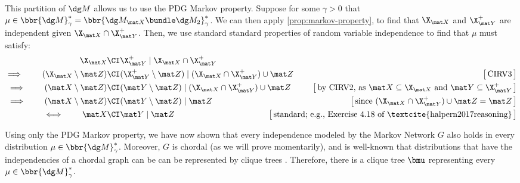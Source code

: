 \begin{lproof}
    This partition of $\dg M$ allows us to use the PDG Markov property.
    Suppose for some $\gamma > 0$ that $\mu \in \bbr{\dg M}^*_\gamma = \bbr{\dg M_{\mat X} \bundle \dg M_2}^*_\gamma$.
    We can then apply \cref{prop:markov-property}, to find that
    $\XX$ and $\XNX$ are independent given $\XX \cap \XNX$.
    Then, we use standard standard properties of random variable independence
        \parencite[CIRV1-5 of][Theorem 4.4.4]{halpern2017reasoning} to find that $\mu$ must satisfy:
    \begin{align*}
        \XX  &\CI \XNX \mid \XX \cap \XNX\\
    \implies\qquad
        (\XX \setminus \mat Z) &\CI (\XNX\setminus \mat Z) \mid (\XX \cap \XNX) \cup \mat Z 
            & \big[\,\text{CIRV3}\,\big] \\
    \implies\qquad
        (\mat X \setminus \mat Z) &\CI (\mat Y \setminus \mat Z) \mid (\XX \cap \XNX) \cup \mat Z 
        & \big[\,\text{by CIRV2, as $\mat X \subseteq \XX$ and $\mat Y \subseteq \XNX$}\,\big] \\
    \implies\qquad
        (\mat X \setminus \mat Z) &\CI (\mat Y \setminus \mat Z) \mid \mat Z 
        & \big[\,\text{since $(\XX \cap \XNX) \cup \mat Z = \mat Z$}\,\big] \\
    \iff\qquad
        \mat X &\CI \mat Y \mid \mat Z 
        & \hspace{-4em}\big[\,\text{standard; e.g., Exercise 4.18 of \textcite{halpern2017reasoning}}\,\big] \\
    \end{align*}
    
    Using only the PDG Markov property, we have now shown that every independence 
    modeled by the Markov Network $G$ also holds
    in every distribution $\mu \in \bbr{\dg M}^*_\gamma$. Moreover, $G$ is chordal (as we will prove momentarily),
    and is well-known that distributions that have the independencies of a chordal graph can be can be represented by clique trees \parencite[Theorem 4.12]{koller2009probabilistic}.
    Therefore, there is a clique tree $\bmu$ representing every $\mu \in \bbr{\dg M}^*_\gamma$.
    

\end{lproof}
